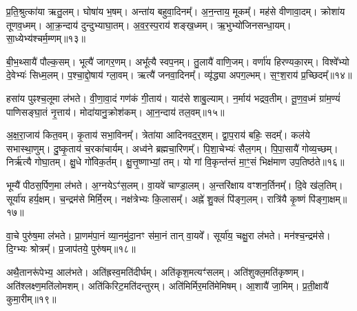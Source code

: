 प्र॒ति॒श्रुत्का॑या ऋतु॒लम्।
घोषा॑य भ॒षम्।
अन्ता॑य बहुवा॒दिनम्᳚।
अ॒न॒न्ताय॒ मूकम्᳚।
मह॑से वीणावा॒दम्।
क्रोशा॑य तूणव॒ध्मम्।
आ॒क्र॒न्दाय॑ दुन्दुभ्याघा॒तम्।
अ॒व॒र॒स्प॒राय॑ शङ्ख॒ध्मम्।
ऋ॒भुभ्यो॑जिनसन्धा॒यम्।
सा॒ध्येभ्य॑श्चर्म॒म्णम्॥१३॥\ip

बी॒भ॒थ्सायै॑ पौल्क॒सम्।
भूत्यै॑ जागर॒णम्।
अभू᳚त्यै स्वप॒नम्।
तु॒लायै॑ वाणि॒जम्।
वर्णा॑य हिरण्यका॒रम्।
विश्वे᳚भ्यो दे॒वेभ्यः॑ सिध्म॒लम्।
प॒श्चा॒द्दो॒षाय॑ ग्ला॒वम्।
ऋत्यै॑ जनवा॒दिनम्᳚।
व्यृ॑द्ध्या अपग॒ल्भम्।
स॒ꣳ॒श॒राय॑ प्र॒च्छिदम्᳚॥१४॥\ip

हसा॑य पुꣴश्च॒लूमा ल॑भते।
वी॒णा॒वा॒दं गण॑कं गी॒ताय॑।
याद॑से शाबु॒ल्याम्।
न॒र्माय॑ भद्र\-व॒तीम्।
तू॒ण॒व॒ध्मं ग्रा॑म॒ण्यं॑ पाणिसङ्घा॒तं नृ॒त्ताय॑।
मोदा॑यानु॒क्रोश॑कम्।
आ॒न॒न्दाय॑ तल॒वम्॥१५॥\ip

अ॒क्ष॒रा॒जाय॑ कित॒वम्।
कृ॒ताय॑ सभा॒विनम्᳚।
त्रेता॑या आदि\-नव\-द॒र्॒शम्।
द्वा॒प॒राय॑ बहिः॒ सदम्᳚।
कल॑ये सभास्था॒णुम्।
दु॒ष्कृ॒ताय॑ च॒रका॑\-चार्यम्।
अध्व॑ने ब्रह्म\-चा॒रिणम्᳚।
पि॒शा॒चेभ्यः॑ सैल॒गम्।
पि॒पा॒सायै॑ गोव्\-य॒च्छम्।
निर्\mbox{}ऋ॑त्यै गो\-घा॒तम्।
क्षु॒धे गो॑विक॒र्तम्।
क्षु॒त्तृ॒ष्णा\-भ्यां॒ तम्।
यो गां वि॒कृन्त॑न्तं मा॒ꣳ॒सं भिक्ष॑माण उप॒तिष्ठ॑ते॥१६॥\ip

भूम्यै॑ पीठस॒र्पिण॒मा ल॑भते।
अ॒ग्नये\-ऽꣳ॑स॒लम्।
वा॒यवे॑ चाण्डा॒लम्।
अ॒न्तरि॑क्षाय वꣳशन॒र्तिनम्᳚।
दि॒वे ख॑ल॒तिम्।
सूर्या॑य हर्य॒क्षम्।
च॒न्द्रम॑से मिर्मि॒रम्।
नक्ष॑त्रेभ्यः कि॒लासम्᳚।
अह्ने॑ शु॒क्लं पि॑ङ्ग॒लम्।
रात्रि॑यै कृ॒ष्णं पि॑ङ्गा॒क्षम्॥१७॥\ip

वा॒चे पुरु॑ष॒मा ल॑भते।
प्रा॒णम॑पा॒नं व्या॒नमु॑दा॒नꣳ स॑मा॒नं तान् वा॒यवे᳚।
सूर्या॑य॒ चक्षु॒रा ल॑भते।
मन॑श्च॒न्द्रम॑से।
दि॒ग्भ्यः श्रोत्रम्᳚।
प्र॒जा\-प॑तये॒ पुरु॑षम्॥१८॥\ip

अथै॒तानरू॑पेभ्य॒ आल॑भते।
अति॑\-ह्रस्व॒मति॑\-दीर्घम्।
अति॑\-कृश॒मत्यꣳ॑सलम्।
अति॑\-शुक्ल॒मति॑\-कृष्णम्।
अति॑\-श्लक्ष्ण॒\-मति॑\-लोमशम्।
अति॑\-किरिट॒मति॑\-दन्तुरम्।
अति॑\-मिर्मिर॒मति॑\-मेमिषम्।
आ॒शायै॑ जा॒मिम्।
प्र॒ती॒क्षायै॑ कुमा॒रीम्॥१९॥\ip%


\clearpage
{}
\setcounter{anuvakam}{0}


